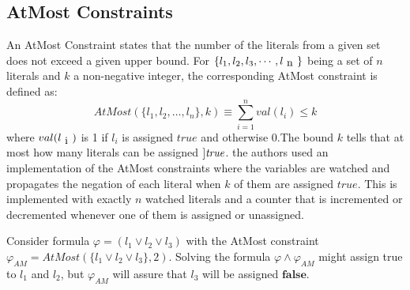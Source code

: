 \subsection{AtMost Constraints}
 An AtMost Constraint states that the number of the literals from a given set does not exceed a given upper bound. For $\{l_{1}, l_{2}, l_{3},\cdots ,l_{\text n}\}$ being a set of $n$ literals and $k$ a non-negative integer, the corresponding AtMost constraint is defined as:
$$AtMost(\{l_{1},l_{2},\ldots,l_{n}\},k)\equiv \sum\limits^{n}_{i=1} val(l_{i})\leqslant k$$
where $val(l_{\text i})$ is 1 if $l_{i}$ is assigned $true$ and otherwise 0.The bound $k$ tells that at most how many literals can be assigned $]\emph{true}$.\newline
the authors used an implementation of the AtMost constraints where the variables are watched and propagates the negation of each literal when $k$ of them are assigned $true$. This is implemented with exactly $n$ watched literals and a counter that is incremented or decremented whenever one of them is assigned or unassigned.
\begin{example}
Consider formula $\varphi = (l_{1}\vee l_{2}\vee l_{3})$ with the AtMost constraint $\varphi_{AM}=AtMost(\{l_{1}\vee l_{2}\vee l_{3}\}, 2)$. Solving the formula $\varphi
\wedge \varphi_{AM}$ might assign true to $l_{1}$ and $l_{2}$, but $\varphi_{AM}$ will assure that $l_{3}$ will be assigned $\mathbf{false}$.
\end{example}
